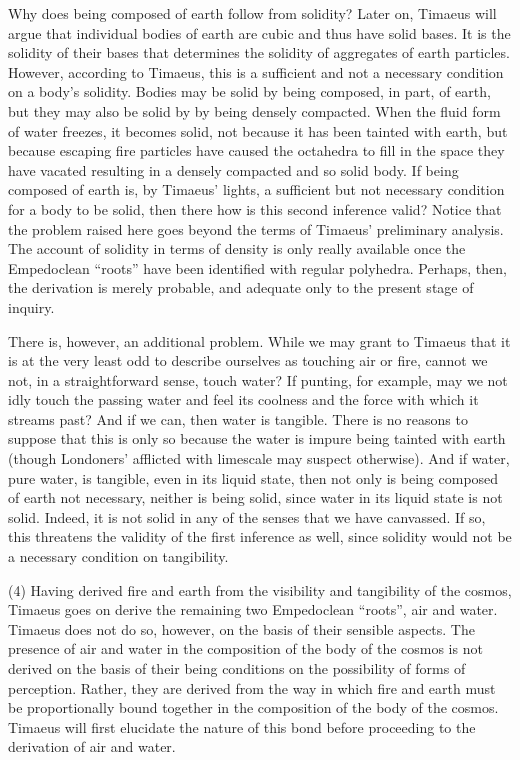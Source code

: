 Why does being composed of earth follow from solidity? Later on, Timaeus will argue that individual bodies of earth are cubic and thus have solid bases. It is the solidity of their bases that determines the solidity of aggregates of earth particles. However, according to Timaeus, this is a sufficient and not a necessary condition on a body's solidity. Bodies may be solid by being composed, in part, of earth, but they may also be solid by by being densely compacted. When the fluid form of water freezes, it becomes solid, not because it has been tainted with earth, but because escaping fire particles have caused the octahedra to fill in the space they have vacated resulting in a densely compacted and so solid body. If being composed of earth is, by Timaeus' lights, a sufficient but not necessary condition for a body to be solid, then there how is this second inference valid? Notice that the problem raised here goes beyond the terms of Timaeus' preliminary analysis. The account of solidity in terms of density is only really available once the Empedoclean ``roots'' have been identified with regular polyhedra. Perhaps, then, the derivation is merely probable, and adequate only to the present stage of inquiry.

There is, however, an additional problem. While we may grant to Timaeus that it is at the very least odd to describe ourselves as touching air or fire, cannot we not, in a straightforward sense, touch water? If punting, for example, may we not idly touch the passing water and feel its coolness and the force with which it streams past? And if we can, then water is tangible. There is no reasons to suppose that this is only so because the water is impure being tainted with earth (though Londoners' afflicted with limescale may suspect otherwise). And if water, pure water, is tangible, even in its liquid state, then not only is being composed of earth not necessary, neither is being solid, since water in its liquid state is not solid. Indeed, it is not solid in any of the senses that we have canvassed. If so, this threatens the validity of the first inference as well, since solidity would not be a necessary condition on tangibility. 

(4) Having derived fire and earth from the visibility and tangibility of the cosmos, Timaeus goes on derive the remaining two Empedoclean ``roots'', air and water. Timae\-us does not do so, however, on the basis of their sensible aspects. The presence of air and water in the composition of the body of the cosmos is not derived on the basis of their being conditions on the possibility of forms of perception. Rather, they are derived from the way in which fire and earth must be proportionally bound together in the composition of the body of the cosmos. Timaeus will first elucidate the nature of this bond before proceeding to the derivation of air and water.

